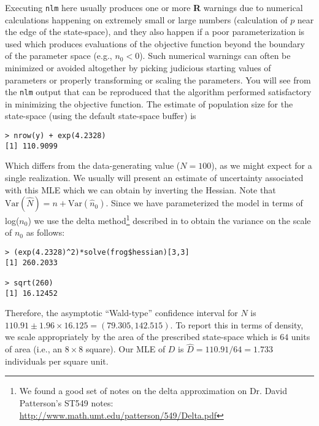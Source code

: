 Executing \mbox{\tt nlm} here
 usually produces one or more {\bf R} warnings due to numerical
calculations happening on extremely small or large numbers
(calculation of $p$ near the
edge of the state-space), and they also happen if a poor
parameterization is used which produces evaluations of the objective
function beyond the boundary of the parameter space (e.g., $n_{0} <
0$). Such numerical warnings can often be minimized or avoided
altogether by picking judicious starting values of parameters or
properly transforming or scaling the parameters.
You will see from the \mbox{\tt nlm} output that can be reproduced that the
algorithm performed satisfactory in minimizing the objective function.
The estimate of population size for the state-space (using the default 
state-space buffer) is
\begin{verbatim}
> nrow(y) + exp(4.2328)
[1] 110.9099
\end{verbatim}
Which differs from the data-generating value ($N=100$), as we might
expect for a single realization. We usually will present an estimate of uncertainty associated
with this MLE which we can obtain by inverting the Hessian. Note that
$\mbox{Var}(\hat{N}) = n + \mbox{Var}(\hat{n}_{0})$.
Since we
have parameterized the model in terms of log($n_{0}$) we use the delta
method\footnote{
We found a good set of notes on the delta approximation on Dr. David
Patterson's ST549 notes: 
\url{http://www.math.umt.edu/patterson/549/Delta.pdf}
}
described in 
\citet[][Appendix F4]{williams_etal:2002}  \citep[see also][]{verhoef:2012}
 to obtain the variance on the scale of $n_{0}$ as
follows:
\begin{verbatim}
> (exp(4.2328)^2)*solve(frog$hessian)[3,3]
[1] 260.2033

> sqrt(260)
[1] 16.12452
\end{verbatim}
Therefore, the asymptotic ``Wald-type'' confidence interval for $N$ is
$110.91 \pm 1.96 \times 16.125 = (79.305, 142.515)$. To report this in
terms of density, we scale appropriately by the area of the prescribed
state-space which is $64$ units of area (i.e., an $8 \times 8$ square).
Our MLE of $D$ is $\hat{D} = 110.91/64  = 1.733$ individuals per
square unit.



